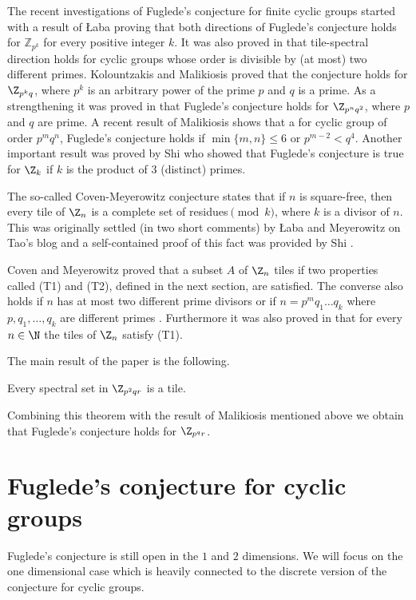         The recent investigations of Fuglede's conjecture for finite cyclic groups started with a result of \L aba \cite{laba} proving that both directions of Fuglede's conjecture holds for $\mathbb{Z}_{p^k}$ for every positive integer $k$. It was also proved in \cite{laba} that tile-spectral direction holds for cyclic groups whose order is divisible by (at most) two different primes.
        Kolountzakis and Malikiosis \cite{Kol} proved that the conjecture holds for $\Z_{p^k q}$, where $p^k$ is an arbitrary power of the prime $p$ and $q$ is a prime. As a strengthening it was proved in \cite{negyen} that Fuglede's conjecture holds for $\Z_{p^nq^2}$, where $p$ and $q$ are prime. A recent result of Malikiosis shows that a for cyclic group of order $p^mq^n$, Fuglede's conjecture holds if $ \min \{m,n \} \le 6$ or $p^{m-2}<q^4$.
        Another important result was proved by Shi \cite{shi} who showed that Fuglede's conjecture is true for $\Z_k$ if $k$ is the product of $3$ (distinct) primes. 
        
        The so-called Coven-Meyerowitz conjecture states that if $n$ is square-free, then every tile of $\Z_n$ is a complete set of residues$\pmod{k}$, where $k$ is a divisor of $n$. This was originally settled (in two short comments) by \L aba and Meyerowitz on Tao's blog and a self-contained proof of this fact was provided by Shi \cite{shi}. 
        
        Coven and Meyerowitz \cite{cm} proved that a subset $A$ of $\Z_n$ tiles if  two properties called (T1) and (T2), defined in the next section, are satisfied. 
        The converse also holds if $n$ has at most two different prime divisors or if $n=p^m q_1 \ldots q_k$ where $p, q_1, \ldots ,q_k$ are different primes \cite{Romanos2020}. Furthermore it was also proved in \cite{cm} that for every $n \in \N$ the tiles of $\Z_n$ satisfy (T1).
        
        The main result of the paper is the following. 
        \begin{Thme}
        Every spectral set in $\Z_{p^2qr}$ is a tile. 
        \end{Thme}
        Combining this theorem with the result of Malikiosis mentioned above we obtain that Fuglede's conjecture holds for $\Z_{p^qr}$.
        \section{Fuglede's conjecture for cyclic groups}
        Fuglede's conjecture is still open in the $1$ and $2$ dimensions. We will focus on the one dimensional case which is heavily connected to the discrete version of the conjecture for cyclic groups. 
        
